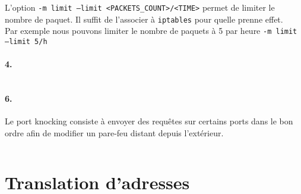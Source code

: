 L'option \texttt{-m limit --limit <PACKETS_COUNT>/<TIME>} permet de limiter le nombre de paquet. Il suffit de l'associer à \texttt{iptables} pour quelle prenne effet.\\
Par exemple nous pouvons limiter le nombre de paquets à 5 par heure  \texttt{-m limit --limit 5/h}

\paragraph{4.}


\inputminted[linenos]{bash}{../sources/TP5/tp5-ex3-5.sh}

\paragraph{6.}
Le port knocking consiste à envoyer des requêtes sur certains ports dans le bon ordre afin de modifier un pare-feu distant depuis l'extérieur.

\inputminted[linenos]{bash}{../sources/TP5/tp5-ex3-7.sh}

\section{Translation d'adresses}
